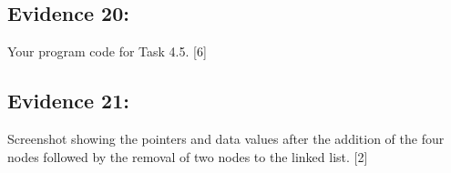 \subsection*{Evidence 20: }

Your program code for Task 4.5. \hfill{}{[}6{]}

\subsection*{Evidence 21: }

Screenshot showing the pointers and data values after the addition
of the four nodes followed by the removal of two nodes to the linked
list. \hfill{}{[}2{]}